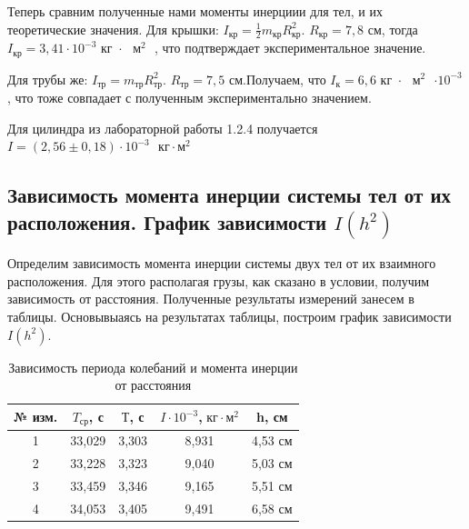 \documentclass[a4paper,12pt]{article}
\begin{document}
    Теперь сравним полученные нами моменты инерциии для тел, и их теоретические значения. Для крышки: $I_\text{кр} = \frac{1}{2}m_\text{кр}R_\text{кр}^2$. $R_\text{кр} = 7,8 \text{ см}$, тогда $I_\text{кр} = 3,41 \cdot 10^{-3} \text{ кг $\cdot$ $\text{м}^2$ }$, что подтверждает экспериментальное значение.
	\par Для трубы же: $I_\text{тр} = m_\text{тр}R_\text{тр}^2$. $R_\text{тр} = 7,5$ см.Получаем, что $I_\text{к} = 6,6\text{  кг $\cdot$ $\text{м}^2$ $\cdot 10^{-3}$}$, что тоже совпадает с полученным экспериментально значением.
    \par Для цилиндра из лабораторной работы 1.2.4 получается $I = (2,56 \pm 0,18)\cdot 10^{-3} \text{ }кг \cdot \text{м}^2$
\subsection*{Зависимость момента инерции системы тел от их расположения. График зависимости $I(h^2)$}
    Определим зависимость момента инерции системы двух тел от их взаимного расположения. Для этого располагая грузы, как сказано в условии, получим зависимость от расстояния.
	Полученные результаты измерений занесем в таблицы. Основывыаясь на результатах таблицы, построим график зависимости $ I(h^{2}) $.

    \begin{table}[H]
		\begin{center}
			\begin{tabular}{| c | c | c | c | c |}
				\hline
				№ изм. & $T_\text{ср}$, с & $Т$, с & $I \cdot 10^{-3}$,$\text{ кг} \cdot \text{м}^2$ & h, см \\ \hline
				1 & 33,029 & 3,303 & 8,931 & 4,53 см   \\ \hline
				2 & 33,228 & 3,323 & 9,040 & 5,03 см  \\ \hline
				3 & 33,459 & 3,346 & 9,165 & 5,51 см \\ \hline
				4 & 34,053 & 3,405 & 9,491 &  6,58 см   \\ \hline
			\end{tabular}
			\caption{Зависимость периода колебаний и момента инерции от расстояния}
		\end{center}
	\end{table}
\end{document}
